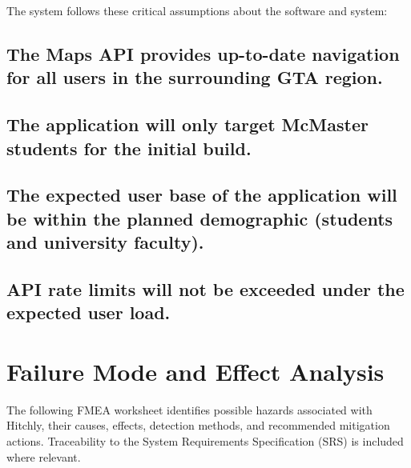 \documentclass{article}
\begin{document}
The system follows these critical assumptions about the software and system:

\subsection{The Maps API provides up-to-date navigation for all users in the surrounding GTA region.}

\subsection{The application will only target McMaster students for the initial build.}

\subsection{The expected user base of the application will be within the planned demographic (students and university faculty).}

\subsection{API rate limits will not be exceeded under the expected user load.}

\section{Failure Mode and Effect Analysis}


The following FMEA worksheet identifies possible hazards associated with Hitchly, their causes,
effects, detection methods, and recommended mitigation actions. Traceability to the System
Requirements Specification (SRS) is included where relevant.
\end{document}
